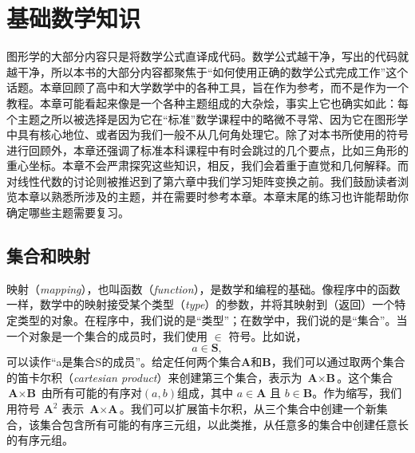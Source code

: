 \chapter{基础数学知识}

图形学的大部分内容只是将数学公式直译成代码。数学公式越干净，写出的代码就越干净，所以本书的大部分内容都聚焦于“如何使用正确的数学公式完成工作”这个话题。本章回顾了高中和大学数学中的各种工具，旨在作为参考，而不是作为一个教程。本章可能看起来像是一个各种主题组成的大杂烩，事实上它也确实如此：每个主题之所以被选择是因为它在“标准”数学课程中的略微不寻常、因为它在图形学中具有核心地位、或者因为我们一般不从几何角处理它。除了对本书所使用的符号进行回顾外，本章还强调了标准本科课程中有时会跳过的几个要点，比如三角形的重心坐标。本章不会严肃探究这些知识，相反，我们会着重于直觉和几何解释。而对线性代数的讨论则被推迟到了第六章中我们学习矩阵变换之前。我们鼓励读者浏览本章以熟悉所涉及的主题，并在需要时参考本章。本章末尾的练习也许能帮助你确定哪些主题需要复习。

\section{集合和映射}

映射（\textit{mapping}），也叫函数（\textit{function}），是数学和编程的基础。像程序中的函数一样，数学中的映射接受某个类型（\textit{type}）的参数，并将其映射到（返回）一个特定类型的对象。在程序中，我们说的是“类型”；在数学中，我们说的是“集合”。当一个对象是一个集合的成员时，我们使用 $\in$ 符号。比如说，
\[
  a \in \textbf{S},
\]
可以读作“a是集合S的成员”。给定任何两个集合$\textbf{A}$和$\textbf{B}$，我们可以通过取两个集合的笛卡尔积（\textit{cartesian product}）来创建第三个集合，表示为 $\textbf{A} \times \textbf{B}$。这个集合 $\textbf{A} \times \textbf{B}$ 由所有可能的有序对$(a,b)$组成，其中 $a \in \textbf{A}$ 且 $b \in \textbf{B}$。作为缩写，我们用符号 $\textbf{A}^2$ 表示 $\textbf{A} \times \textbf{A}$。我们可以扩展笛卡尔积，从三个集合中创建一个新集合，该集合包含所有可能的有序三元组，以此类推，从任意多的集合中创建任意长的有序元组。

